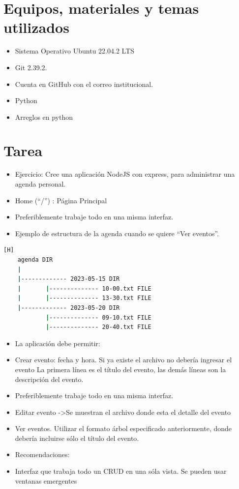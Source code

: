 \documentclass{article}
\begin{document}
\section{Equipos, materiales y temas utilizados}
\begin{itemize}
	\item Sistema Operativo Ubuntu 22.04.2 LTS
	\item Git 2.39.2.
	\item Cuenta en GitHub con el correo institucional.
	\item Python
	\item Arreglos en python
\end{itemize}

\section{Tarea}
\begin{itemize}
    \item Ejercicio: Cree una aplicación NodeJS con express, para administrar una agenda personal.
    \item Home (“/”) : Página Principal
    \item Preferiblemente trabaje todo en una misma interfaz.
    \item Ejemplo de estructura de la agenda cuando se quiere “Ver eventos”.
\end{itemize}
\clearpage

\begin{lstlisting}[language=bash,caption={Esctructura de archivos}][H]
    agenda DIR
	|
    |------------- 2023-05-15 DIR
    |		|-------------- 10-00.txt FILE
    |		|-------------- 13-30.txt FILE
    |------------- 2023-05-20 DIR
            |-------------- 09-10.txt FILE
            |-------------- 20-40.txt FILE
\end{lstlisting}

\begin{itemize}
    \item La aplicación debe permitir:
    \item Crear evento: fecha y hora. Si ya existe el archivo no debería ingresar el evento La primera línea es el título del evento, las demás líneas son la descripción del evento.
    \item Preferiblemente trabaje todo en una misma interfaz.
    \item Editar evento ->Se muestran el archivo  donde esta el detalle del evento
    \item Ver eventos. Utilizar el formato árbol especificado anteriormente, donde debería incluirse sólo el título del evento.
    \item Recomendaciones:
    \item Interfaz que trabaja todo un CRUD en una sóla vista. Se pueden usar ventanas emergentes
\end{itemize}
\end{document}
